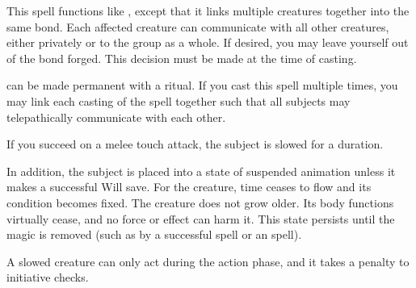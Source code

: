 \begin{spelleffect}
  This spell functions like , except that it links multiple creatures together into the same bond. Each affected creature can communicate with all other creatures, either privately or to the group as a whole. If desired, you may leave yourself out of the bond forged. This decision must be made at the time of casting.
\end{spelleffect}
\begin{spellnotes}
   can be made permanent with a  ritual. If you cast this spell multiple times, you may link each casting of the spell together such that all subjects may telepathically communicate with each other. 
\end{spellnotes}

\begin{spelleffect}
  If you succeed on a melee touch attack, the subject is slowed for a \durshort duration.
\end{spelleffect}
\begin{spellblood}
  In addition, the subject is placed into a state of suspended animation unless it makes a successful Will save. For the creature, time ceases to flow and its condition becomes fixed. The creature does not grow older. Its body functions virtually cease, and no force or effect can harm it. This state persists until the magic is removed (such as by a successful  spell or an  spell).
\end{spellblood}
\begin{spellnotes}
 A slowed creature can only act during the action phase, and it takes a  penalty to initiative checks.
\end{spellnotes}


